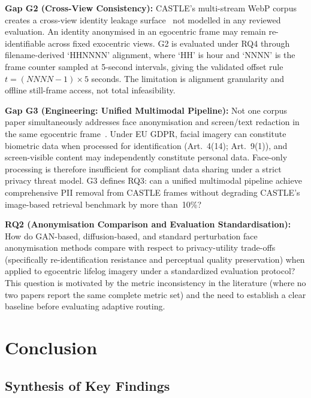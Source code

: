 \documentclass[10pt, twocolumn]{IEEEtran}
\begin{document}
\textbf{Gap G2 (Cross-View Consistency):} CASTLE's multi-stream WebP corpus creates a cross-view identity leakage surface~\cite{rossetto2025castle} not modelled in any reviewed evaluation. An identity anonymised in an egocentric frame may remain re-identifiable across fixed exocentric views. G2 is evaluated under RQ4 through filename-derived `HHNNNN' alignment, where `HH' is hour and `NNNN' is the frame counter sampled at 5-second intervals, giving the validated offset rule $t=(NNNN-1)\times5$ seconds. The limitation is alignment granularity and offline still-frame access, not total infeasibility.

\textbf{Gap G3 (Engineering: Unified Multimodal Pipeline):} Not one corpus paper simultaneously addresses face anonymisation and screen/text redaction in the same egocentric frame~\cite{li2026screen,liao2020dbnet,baek2019craft,li2023trocr}. Under EU GDPR, facial imagery can constitute biometric data when processed for identification (Art.~4(14); Art.~9(1)), and screen-visible content may independently constitute personal data. Face-only processing is therefore insufficient for compliant data sharing under a strict privacy threat model.  G3 defines RQ3: can a unified multimodal pipeline achieve comprehensive PII removal from CASTLE frames without degrading CASTLE's image-based retrieval benchmark by more than~10\%?

\textbf{RQ2 (Anonymisation Comparison and Evaluation Standardisation):} How do GAN-based, diffusion-based, and standard perturbation face anonymisation methods compare with respect to privacy-utility trade-offs (specifically re-identification resistance and perceptual quality preservation) when applied to egocentric lifelog imagery under a standardized evaluation protocol? This question is motivated by the metric inconsistency in the literature (where no two papers report the same complete metric set) and the need to establish a clear baseline before evaluating adaptive routing.

\section{Conclusion}
\label{sec:conclusion}

\subsection{Synthesis of Key Findings}
\end{document}
